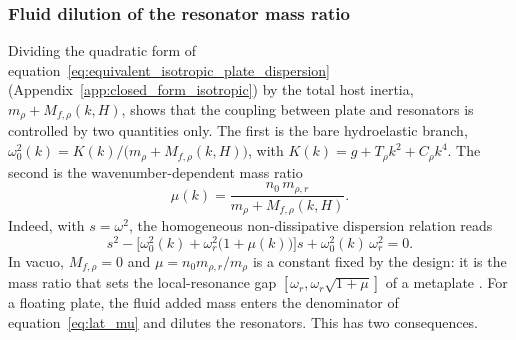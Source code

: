 {\color{red} %
\subsubsection{Fluid dilution of the resonator mass ratio}\label{subsubsec:fluid_dilution}
Dividing the quadratic form of equation~\eqref{eq:equivalent_isotropic_plate_dispersion} (Appendix~\ref{app:closed_form_isotropic}) by the total host inertia, $m_\rho+M_{f,\rho}(k,H)$, shows that the coupling between plate and resonators is controlled by two quantities only. The first is the bare hydroelastic branch, $\omega_0^2(k)=K(k)/\big(m_\rho+M_{f,\rho}(k,H)\big)$, with $K(k)=g+T_\rho k^2+C_\rho k^4$. The second is the wavenumber-dependent mass ratio
\begin{equation}\label{eq:lat_mu}
    \mu(k)=\frac{n_0\,m_{\rho,r}}{m_\rho+M_{f,\rho}(k,H)} .
\end{equation}
Indeed, with $s=\omega^2$, the homogeneous non-dissipative dispersion relation reads
\begin{equation}\label{eq:normalised_quadratic}
    s^2-\big[\omega_0^2(k)+\omega_r^2\big(1+\mu(k)\big)\big]s+\omega_0^2(k)\,\omega_r^2=0 .
\end{equation}
In vacuo, $M_{f,\rho}=0$ and $\mu=n_0m_{\rho,r}/m_\rho$ is a constant fixed by the design: it is the mass ratio that sets the local-resonance gap $[\omega_r,\omega_r\sqrt{1+\mu}]$ of a metaplate \cite{xiao2012flexural}. For a floating plate, the fluid added mass enters the denominator of equation~\eqref{eq:lat_mu} and dilutes the resonators. This has two consequences.

}
